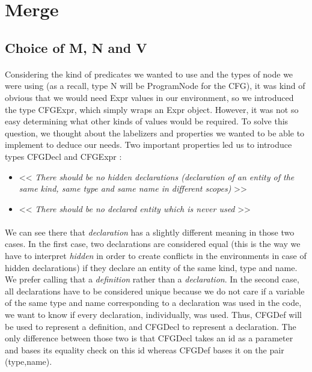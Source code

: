 \documentclass{report}
\begin{document}
\section{Merge}

\subsection{Choice of M, N and V}

\paragraph{}
\hspace{4mm}Considering the kind of predicates we wanted to use and the types of node we were using (as a recall, type N will be ProgramNode for the CFG), it was kind
of obvious that we would need Expr values in our environment, so we introduced the type CFGExpr, which simply wraps an Expr object. However, it was not so easy determining what other kinds
of values would be required. To solve this question, we thought about the labelizers and properties we wanted to be able to implement to deduce our needs. 
Two important properties led us to introduce types CFGDecl and CFGExpr :

\vspace{1.5mm}
\begin{itemize}
\item << \textit{There should be no hidden declarations  (declaration of an entity of the same kind, same type and same name in different scopes)} >>\vspace{1mm}
\item << \textit{There should be no declared entity which is never used} >>\vspace{1mm}
\end{itemize}

\paragraph{}
\hspace{4mm}We can see there that \textit{declaration} has a slightly different meaning in those two cases. In the first case,
two declarations are considered equal (this is the way we have to interpret \textit{hidden} in order to create conflicts in the environments in case
of hidden declarations) if they declare an entity of the same kind, type and 
name. We prefer calling that a \textit{definition} rather than a \textit{declaration}. In the second case,
all declarations have to be considered unique because we do not care if a variable of the same type and name corresponding to a declaration was used in the code,
we want to know if every declaration, individually, was used. Thus, CFGDef will be used to represent a definition, and CFGDecl to represent a declaration.
The only difference between those two is that CFGDecl takes an id as a parameter and bases its equality check on this id whereas CFGDef bases it on the pair (type,name).
\end{document}
